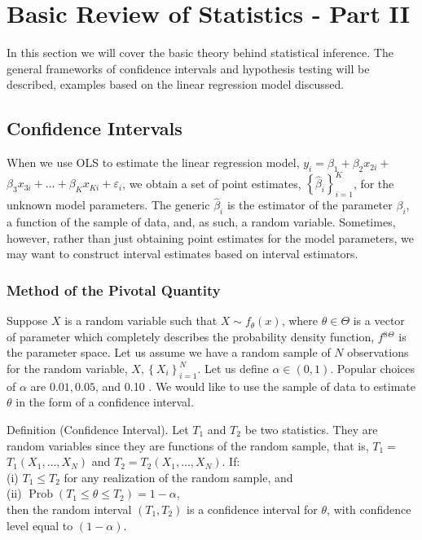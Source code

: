\section{Basic Review of Statistics - Part II}
In this section we will cover the basic theory behind statistical inference. The general frameworks of confidence intervals and hypothesis testing will be described, examples based on the linear regression model discussed.

\subsection{Confidence Intervals}
When we use OLS to estimate the linear regression model, $y_{i}=\beta_{1}+\beta_{2} x_{2 i}+$ $\beta_{3} x_{3 i}+\ldots+\beta_{K} x_{K i}+\varepsilon_{i}$, we obtain a set of point estimates, $\left\{\widehat{\beta}_{i}\right\}_{i=1}^{K}$, for the unknown model parameters. The generic $\widehat{\beta}_{i}$ is the estimator of the parameter $\beta_{i}$, a function of the sample of data, and, as such, a random variable. Sometimes, however, rather than just obtaining point estimates for the model parameters, we may want to construct interval estimates based on interval estimators.

\subsubsection{Method of the Pivotal Quantity}
Suppose $X$ is a random variable such that $X \sim f_{\theta}(x)$, where $\theta \in \Theta$ is a vector of parameter which completely describes the probability density function, $f{ }^{8}{ }^{\Theta}$ is the parameter space. Let us assume we have a random sample of $N$ observations for the random variable, $X,\left\{X_{i}\right\}_{i=1}^{N}$. Let us define $\alpha \in(0,1)$. Popular choices of $\alpha$ are $0.01,0.05$, and 0.10 . We would like to use the sample of data to estimate $\theta$ in the form of a confidence interval.

Definition (Confidence Interval). Let $T_{1}$ and $T_{2}$ be two statistics. They are random variables since they are functions of the random sample, that is, $T_{1}=$ $T_{1}\left(X_{1}, \ldots, X_{N}\right)$ and $T_{2}=T_{2}\left(X_{1}, \ldots, X_{N}\right)$. If:\\
(i) $T_{1} \leq T_{2}$ for any realization of the random sample, and\\
(ii) $\operatorname{Prob}\left(T_{1} \leq \theta \leq T_{2}\right)=1-\alpha$,\\
then the random interval $\left(T_{1}, T_{2}\right)$ is a confidence interval for $\theta$, with confidence level equal to $(1-\alpha)$.

